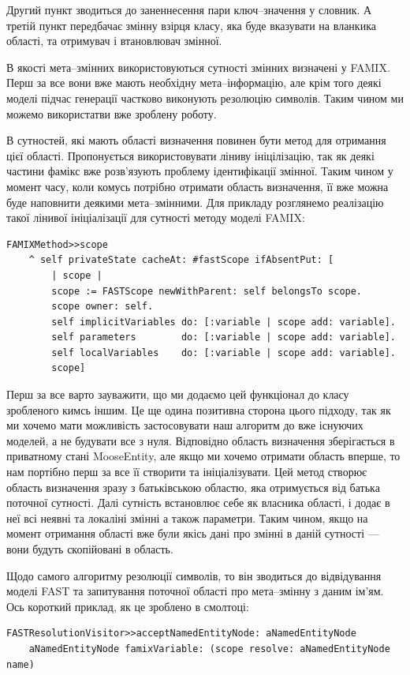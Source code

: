 \documentclass[12pt,a4paper]{article}
\begin{document}
Другий пункт зводиться до заненнесення пари ключ--значення у словник. А третій пункт передбачає змінну взірця класу, яка буде вказувати на вланкика області, та отримувач і втановлювач змінної.

В якості мета--змінних використовуються сутності змінних визначені у FAMIX. Перш за все вони вже мають необхідну мета--інформацію, але крім того деякі моделі підчас генерації частково виконують резолюцію символів. Таким чином ми можемо використатви вже зроблену роботу.

В сутностей, які мають області визначення повинен бути метод для отримання цієї області. Пропонується використовувати ліниву ініцілізацію, так як деякі частини фамікс вже розв'язують проблему ідентифікації змінної. Таким чином у момент часу, коли комусь потрібно отримати область визначення, її вже можна буде наповнити деякими мета--змінними. Для прикладу розглянемо реалізацію такої лінивої ініціалізації для сутності методу моделі FAMIX:
\begin{lstlisting}[language=Smalltalk]
FAMIXMethod>>scope
	^ self privateState cacheAt: #fastScope ifAbsentPut: [
		| scope |
		scope := FASTScope newWithParent: self belongsTo scope.
		scope owner: self.
		self implicitVariables do: [:variable | scope add: variable].
		self parameters        do: [:variable | scope add: variable].
		self localVariables    do: [:variable | scope add: variable].
		scope]
\end{lstlisting}

Перш за все варто зауважити, що ми додаємо цей функціонал до класу зробленого кимсь іншим. Це ще одина позитивна сторона цього підходу, так як ми хочемо мати можливість застосовувати наш алгоритм до вже існуючих моделей, а не будувати все з нуля. Відповідно область визначення зберігається в приватному стані MooseEntity, але якщо ми хочемо отримати область вперше, то нам портібно перш за все її створити та ініціалізувати. Цей метод створює область визначення зразу з батьківською областю, яка отримується від батька поточної сутності. Далі сутність встановлює себе як власника області, і додає в неї всі неявні та локаліні змінні а також параметри. Таким чином, якщо на момент отримання області вже були якісь дані про змінні в даній сутності --- вони будуть скопійовані в область.

Щодо самого алгоритму резолюції символів, то він зводиться до відвідування моделі FAST та запитування поточної області про мета--змінну з даним ім'ям. Ось короткий приклад, як це зроблено в смолтоці:
\begin{lstlisting}[language=Smalltalk]
FASTResolutionVisitor>>acceptNamedEntityNode: aNamedEntityNode
	aNamedEntityNode famixVariable: (scope resolve: aNamedEntityNode name)
\end{lstlisting}
\end{document}
